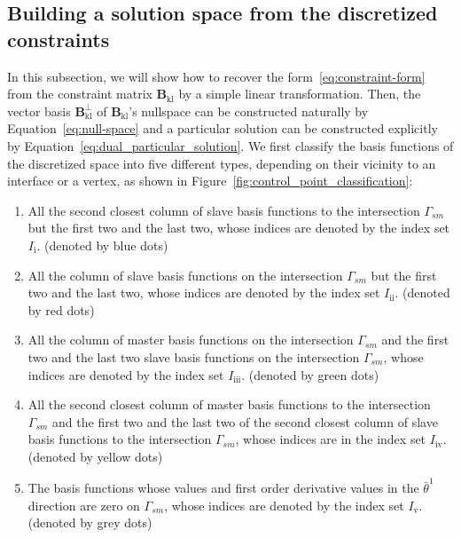 \subsection{Building a solution space from the discretized constraints}

In this subsection, we will show how to recover the form~\eqref{eq:constraint-form} from the constraint matrix $\mathbf{B}_\text{kl}$ by a simple linear transformation. Then, the vector basis $\mathbf{B}^\perp_\text{kl}$ of $\mathbf{B}_\text{kl}$'s nullspace can be constructed naturally by Equation~\eqref{eq:null-space} and a particular solution can be constructed explicitly by Equation~\eqref{eq:dual_particular_solution}. We first classify the basis functions of the discretized space into five different types, depending on their vicinity to an interface or a vertex, as shown in Figure~\ref{fig:control_point_classification}:
\begin{enumerate}
	\item All the second closest column of slave basis functions to the intersection $\Gamma_{sm}$ but the first two and the last two, whose indices are denoted by the index set $I_\text{i}$. (denoted by blue dots)
	\item All the column of slave basis functions on the intersection $\Gamma_{sm}$ but the first two and the last two, whose indices are denoted by the index set $I_\text{ii}$. (denoted by red dots)
	\item All the column of master basis functions on the intersection $\Gamma_{sm}$ and the first two and the last two slave basis functions on the intersection $\Gamma_{sm}$, whose indices are denoted by the index set $I_\text{iii}$. (denoted by green dots)
	\item All the second closest column of master basis functions to the intersection $\Gamma_{sm}$ and the first two and the last two of the second closest column of slave basis functions to the intersection $\Gamma_{sm}$, whose indices are in the index set $I_\text{iv}$. (denoted by yellow dots)
	\item The basis functions whose values and first order derivative values in the $\bar{\theta}^1$ direction are zero on $\Gamma_{sm}$, whose indices are denoted by the index set $I_\text{v}$. (denoted by grey dots)
\end{enumerate}\par

